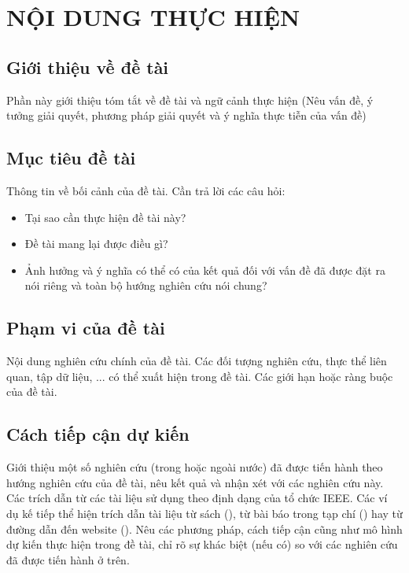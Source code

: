 \documentclass{article}[14pt]
\begin{document}
\section{NỘI DUNG THỰC HIỆN}
 {


  \subsection{Giới thiệu về đề tài}

  Phần này giới thiệu tóm tắt về đề tài và ngữ cảnh thực hiện (Nêu vấn đề, ý
  tưởng giải quyết, phương pháp giải quyết và ý nghĩa thực tiễn của vấn đề)


  \subsection{Mục tiêu đề tài}

  Thông tin về bối cảnh của đề tài. Cần trả lời các câu hỏi:
  \begin{itemize}
	  \item Tại sao cần thực hiện đề tài này?
	  \item Đề tài mang lại được điều gì?
	  \item Ảnh hưởng và ý nghĩa có thể có của kết quả đối với vấn đề đã được đặt ra nói riêng và toàn bộ hướng nghiên cứu nói chung?
  \end{itemize}

  \subsection{Phạm vi của đề tài}

  Nội dung nghiên cứu chính của đề tài. Các đối tượng nghiên cứu, thực thể liên
  quan, tập dữ liệu, ... có thể xuất hiện trong đề tài. Các giới hạn hoặc ràng
  buộc của đề tài.

  \subsection{Cách tiếp cận dự kiến}

  Giới thiệu một số nghiên cứu (trong hoặc ngoài nước) đã được tiến hành theo
  hướng nghiên cứu của đề tài, nêu kết quả và nhận xét với các nghiên cứu này.
  Các trích dẫn từ các tài liệu sử dụng theo định dạng của tổ chức IEEE. Các ví
  dụ kế tiếp thể hiện trích dẫn tài liệu từ sách (\cite{latexcompanion}), từ bài
  báo trong tạp chí (\cite{einstein}) hay từ đường dẫn đến website
  (\cite{knuthwebsite}). \newline Nêu các phương pháp, cách tiếp cận cũng như mô
  hình dự kiến thực hiện trong đề tài, chỉ rõ sự khác biệt (nếu có) so với các
  nghiên cứu đã được tiến hành ở trên.

}
\end{document}
